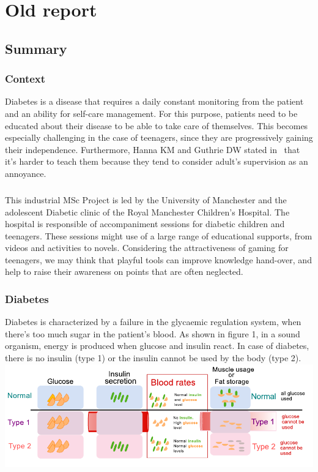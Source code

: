 \documentclass[12pt,MSc]{muthesis}
\begin{document}
\chapter{Old report}
\section{Summary}
\subsection{Context}
Diabetes is a disease that requires a daily constant monitoring from the patient and an ability for self-care management. For this purpose, patients need to be educated about their disease to be able to take care of themselves. This becomes especially challenging in the case of teenagers, since they are progressively gaining their independence. 
Furthermore, Hanna KM and Guthrie DW stated in~\cite{HannaKM} that it's harder to teach them because they tend to consider adult's supervision as an annoyance.
\paragraph{}
This industrial MSc Project is led by the University of Manchester and the adolescent Diabetic clinic of the Royal Manchester Children’s Hospital. The hospital is responsible of accompaniment sessions for diabetic children and teenagers. These sessions might use of a large range of educational supports, from videos and activities to novels. Considering the attractiveness of gaming for teenagers, we may think that playful tools can improve knowledge hand-over, and help to raise their awareness on points that are often neglected. 

\subsection{Diabetes}
Diabetes is characterized by a failure in the glycaemic regulation system, when there's too much sugar in the patient's blood. As shown in figure 1, in a sound organism, energy is produced when glucose and insulin react. In case of diabetes, there is no insulin (type 1) or the insulin cannot be used by the body (type 2).
\\
\includegraphics{diabetes_drawing}
\end{document}

